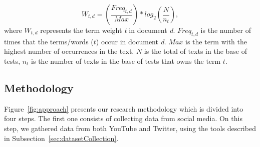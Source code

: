 \begin{equation*}
    W_{t,d} = \left ( \frac{Freq_{t,d}}{Max} \right ) * log_2 \left ( \frac{N}{n_t} \right),
\end{equation*}
where \( W_{t,d}\) represents the term weight \textit{t} in document \textit{d}. 
\( Freq_{t,d}\) is the number of times that the terms/words ($t$) occur in document \textit{d}. 
\( Max\) is the term with the highest number of occurrences in the text. 
\( N \) is the total of texts in the base of tests, \( n_t \) is the number of texts in the base of tests that owns the term \( t \).

\subsection{Methodology}

Figure~\ref{fig:approach} presents our research methodology 
which is divided into four steps. The first one consists of collecting data from social media. On this step, we gathered data from both YouTube and Twitter, using the tools described in Subsection~\ref{sec:datasetCollection}. 

